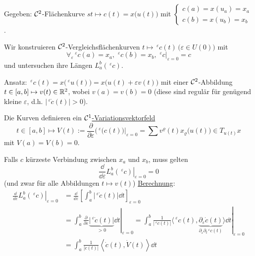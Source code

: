 \begin{beweis}
 Gegeben: \(\mathcal{C}^2\)-Flächenkurve \(st \mapsto c(t) = x\big(u(t)\big)\) mit \(\begin{cases}
                                                                            c(a) = x(u_a) = x_a \\
                                                                            c(b) = x(u_b) = x_b
                                                                           \end{cases}\). \par
 Wir konstruieren \(\mathcal{C}^2\)-Vergleichsflächenkurven \(t \mapsto \,^\varepsilon c(t) \, \big(\varepsilon \in U(0)\big)\) mit
 \[
  \forall_\varepsilon \,^\varepsilon c(a) = x_a, \, \,^\varepsilon c(b) = x_b, \, \,^\varepsilon c |_{\varepsilon = 0} = c
 \]
 und untersuchen ihre Längen \(L_a^b (\,^\varepsilon c)\). \par
 Ansatz: \(\,^\varepsilon c(t) = x\big( \,^\varepsilon u(t)\big) = x\big( u(t) + \varepsilon v(t)\big)\) mit einer \(\mathcal{C}^2\)-Abbildung \(t \in [a,b] \mapsto v(t) \in \mathbb{R}^2\), wobei \(v(a) = v(b) = 0\) (diese sind regulär für genügend kleine \(\varepsilon\), d.h. \(|\,^\varepsilon \dot c(t) | > 0\)). \par
 Die Kurven definieren ein \uline{\(\mathcal{C}^1\)-Variationsvektorfeld}
 \[
  t \in [a,b] \mapsto V(t):= \frac{\partial}{\partial \varepsilon} \big(\,^\varepsilon \left.(c(t)\big)\right|_{\varepsilon = 0} = \sum v^\varrho(t) x_\varrho \big(u(t)\big) \in T_{u(t)}x
 \]
 mit \(V(a) = V(b) = 0\). \par
 Falls \(c\) kürzeste Verbindung zwischen \(x_a\) und \(x_b\), muss gelten
 \[
  \boxed{\frac{\dd}{\dd\varepsilon} \left.L_a^b (\,^\varepsilon c)\right|_{\varepsilon = 0} = 0}
 \]
 \big(und zwar für alle Abbildungen \(t \mapsto v(t)\)\big)
 \uline{Berechnung}:
 \begin{align*}
  \frac{\dd}{\dd \varepsilon} \left. L_a^b (\,^\varepsilon c) \right|_{\varepsilon = 0} &= \frac{\dd}{\dd \varepsilon} \left[ \int_a^b |\,^\varepsilon \dot c(t)| \dd t\right]_{\varepsilon = 0}\\
  &= \int_a^b \frac{\partial}{\partial \varepsilon} \left.\underbrace{|\,^\varepsilon \dot c(t)|}_{> 0} \dd t \right|_{\varepsilon = 0} = \int_a^b \frac1{|\,^\varepsilon c(t)|} \langle \,^\varepsilon c(t), \left.\underbrace{\partial_\varepsilon \dot c(t)}_{\partial_\varepsilon \partial_t \,^\varepsilon c(t)} \rangle \dd t \right|_{\varepsilon = 0} \\
  &= \int_a^b \frac{1}{|\dot c(t)|} \left\langle \dot c(t), \dot V(t) \right\rangle \dd t \\

\end{align*}
\end{beweis}
